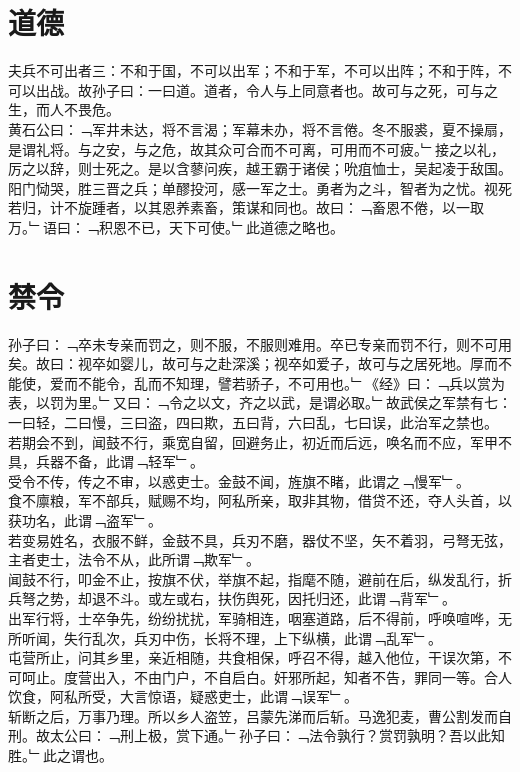 \chapter{道德}%
夫兵不可出者三：不和于国，不可以出军；不和于军，不可以出阵；不和于阵，不可以出战。故孙子曰：一曰道。道者，令人与上同意者也。故可与之死，可与之生，而人不畏危。\\
黄石公曰：﹁军井未达，将不言渴；军幕未办，将不言倦。冬不服裘，夏不操扇，是谓礼将。与之安，与之危，故其众可合而不可离，可用而不可疲。﹂接之以礼，厉之以辞，则士死之。是以含蓼问疾，越王霸于诸侯；吮疽恤士，吴起凌于敌国。阳门恸哭，胜三晋之兵；单醪投河，感一军之士。勇者为之斗，智者为之忧。视死若归，计不旋踵者，以其恩养素畜，策谋和同也。故曰：﹁畜恩不倦，以一取万。﹂语曰：﹁积恩不已，天下可使。﹂此道德之略也。
%
%
\chapter{禁令}%
孙子曰：﹁卒未专亲而罚之，则不服，不服则难用。卒已专亲而罚不行，则不可用矣。故曰：视卒如婴儿，故可与之赴深溪；视卒如爱子，故可与之居死地。厚而不能使，爱而不能令，乱而不知理，譬若骄子，不可用也。﹂《经》曰：﹁兵以赏为表，以罚为里。﹂又曰：﹁令之以文，齐之以武，是谓必取。﹂故武侯之军禁有七：一曰轻，二曰慢，三曰盗，四曰欺，五曰背，六曰乱，七曰误，此治军之禁也。\\
若期会不到，闻鼓不行，乘宽自留，回避务止，初近而后远，唤名而不应，军甲不具，兵器不备，此谓﹁轻军﹂。\\
受令不传，传之不审，以惑吏士。金鼓不闻，旌旗不睹，此谓之﹁慢军﹂。\\
食不廪粮，军不部兵，赋赐不均，阿私所亲，取非其物，借贷不还，夺人头首，以获功名，此谓﹁盗军﹂。\\
若变易姓名，衣服不鲜，金鼓不具，兵刃不磨，器仗不坚，矢不着羽，弓弩无弦，主者吏士，法令不从，此所谓﹁欺军﹂。\\
闻鼓不行，叩金不止，按旗不伏，举旗不起，指麾不随，避前在后，纵发乱行，折兵弩之势，却退不斗。或左或右，扶伤舆死，因托归还，此谓﹁背军﹂。\\
出军行将，士卒争先，纷纷扰扰，军骑相连，咽塞道路，后不得前，呼唤喧哗，无所听闻，失行乱次，兵刃中伤，长将不理，上下纵横，此谓﹁乱军﹂。\\
屯营所止，问其乡里，亲近相随，共食相保，呼召不得，越入他位，干误次第，不可呵止。度营出入，不由门户，不自启白。奸邪所起，知者不告，罪同一等。合人饮食，阿私所受，大言惊语，疑惑吏士，此谓﹁误军﹂。\\
斩断之后，万事乃理。所以乡人盗笠，吕蒙先涕而后斩。马逸犯麦，曹公割发而自刑。故太公曰：﹁刑上极，赏下通。﹂孙子曰：﹁法令孰行？赏罚孰明？吾以此知胜。﹂此之谓也。
%
%
